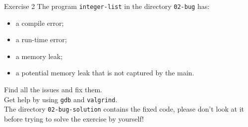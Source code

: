 \documentclass[10pt]{beamer}
\begin{document}
\begin{frame}{Exercise 2}
The program \texttt{integer-list} in the directory \texttt{02-bug} has:

\begin{itemize}
    \item a compile error;
    \item a run-time error;
    \item a memory leak;
    \item a potential memory leak that is not captured by the main.
\end{itemize}
\vspace{0.5cm}
Find all the issues and fix them. \\[3mm]

Get help by using \texttt{gdb} and \texttt{valgrind}.\\[3mm]

The directory \texttt{02-bug-solution} contains the fixed code,
please don't look at it before trying to solve the exercise by yourself!
\end{frame}
\end{document}
